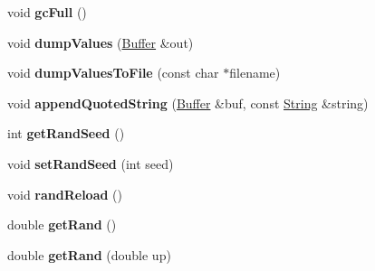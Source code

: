 \begin{DoxyCompactItemize}
\item 
void {\bfseries gc\+Full} ()\hypertarget{class_object_script_1_1_o_s_1_1_core_ac01506022c7bd2c4cc5aee9c59417bc0}{}\label{class_object_script_1_1_o_s_1_1_core_ac01506022c7bd2c4cc5aee9c59417bc0}

\item 
void {\bfseries dump\+Values} (\hyperlink{class_object_script_1_1_o_s_1_1_core_1_1_buffer}{Buffer} \&out)\hypertarget{class_object_script_1_1_o_s_1_1_core_a3aba46d2a0b2ba1b53bc7bc5f71dc3f0}{}\label{class_object_script_1_1_o_s_1_1_core_a3aba46d2a0b2ba1b53bc7bc5f71dc3f0}

\item 
void {\bfseries dump\+Values\+To\+File} (const char $\ast$filename)\hypertarget{class_object_script_1_1_o_s_1_1_core_a33b3b23bef5b55c89db79a4d5f5ddfd3}{}\label{class_object_script_1_1_o_s_1_1_core_a33b3b23bef5b55c89db79a4d5f5ddfd3}

\item 
void {\bfseries append\+Quoted\+String} (\hyperlink{class_object_script_1_1_o_s_1_1_core_1_1_buffer}{Buffer} \&buf, const \hyperlink{class_object_script_1_1_o_s_1_1_core_1_1_string}{String} \&string)\hypertarget{class_object_script_1_1_o_s_1_1_core_ad625c1a8c5f0d9e9653f82109d5223ef}{}\label{class_object_script_1_1_o_s_1_1_core_ad625c1a8c5f0d9e9653f82109d5223ef}

\item 
int {\bfseries get\+Rand\+Seed} ()\hypertarget{class_object_script_1_1_o_s_1_1_core_a680d2ccc3280288fa22576bf415b8da3}{}\label{class_object_script_1_1_o_s_1_1_core_a680d2ccc3280288fa22576bf415b8da3}

\item 
void {\bfseries set\+Rand\+Seed} (int seed)\hypertarget{class_object_script_1_1_o_s_1_1_core_a2e666bdff50594af05734f9b7c932fb6}{}\label{class_object_script_1_1_o_s_1_1_core_a2e666bdff50594af05734f9b7c932fb6}

\item 
void {\bfseries rand\+Reload} ()\hypertarget{class_object_script_1_1_o_s_1_1_core_a1f93f7393b30081c9fbf9e373173175f}{}\label{class_object_script_1_1_o_s_1_1_core_a1f93f7393b30081c9fbf9e373173175f}

\item 
double {\bfseries get\+Rand} ()\hypertarget{class_object_script_1_1_o_s_1_1_core_a831e91a8a80a91c18256324de1e9f45a}{}\label{class_object_script_1_1_o_s_1_1_core_a831e91a8a80a91c18256324de1e9f45a}

\item 
double {\bfseries get\+Rand} (double up)\hypertarget{class_object_script_1_1_o_s_1_1_core_a32e8c27a6f9496653d428115dddeecb7}{}\label{class_object_script_1_1_o_s_1_1_core_a32e8c27a6f9496653d428115dddeecb7}


\end{DoxyCompactItemize}
